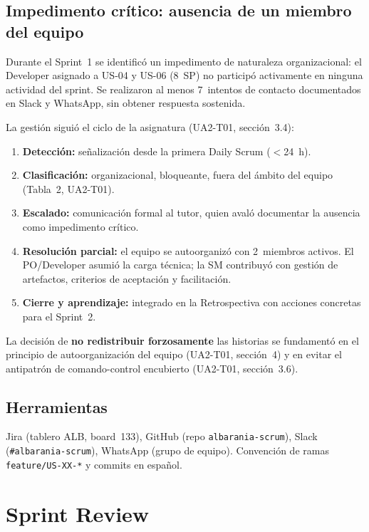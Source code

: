 \documentclass[11pt,a4paper]{article}
\begin{document}
\subsection{Impedimento crítico: ausencia de un miembro del equipo}

Durante el Sprint~1 se identificó un impedimento de naturaleza organizacional: el Developer asignado a US-04 y US-06 (8~SP) no participó activamente en ninguna actividad del sprint. Se realizaron al menos 7~intentos de contacto documentados en Slack y WhatsApp, sin obtener respuesta sostenida.

La gestión siguió el ciclo de la asignatura (UA2-T01, sección~3.4):

\begin{enumerate}
\item \textbf{Detección:} señalización desde la primera Daily Scrum ($<$24~h).
\item \textbf{Clasificación:} organizacional, bloqueante, fuera del ámbito del equipo (Tabla~2, UA2-T01).
\item \textbf{Escalado:} comunicación formal al tutor, quien avaló documentar la ausencia como impedimento crítico.
\item \textbf{Resolución parcial:} el equipo se autoorganizó con 2~miembros activos. El PO/Developer asumió la carga técnica; la SM contribuyó con gestión de artefactos, criterios de aceptación y facilitación.
\item \textbf{Cierre y aprendizaje:} integrado en la Retrospectiva con acciones concretas para el Sprint~2.
\end{enumerate}

La decisión de \textbf{no redistribuir forzosamente} las historias se fundamentó en el principio de autoorganización del equipo (UA2-T01, sección~4) y en evitar el antipatrón de comando-control encubierto (UA2-T01, sección~3.6).

\subsection{Herramientas}
Jira (tablero ALB, board~133), GitHub (repo \texttt{albarania-scrum}), Slack (\texttt{\#albarania-scrum}), WhatsApp (grupo de equipo). Convención de ramas \texttt{feature/US-XX-*} y commits en español.

\section{Sprint Review}
\end{document}
